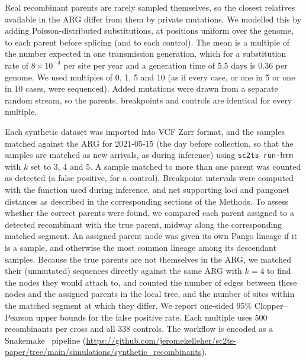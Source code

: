 \documentclass[12pt]{article}
\begin{document}
Real recombinant parents are rarely sampled themselves,
so the closest relatives available in the ARG differ from them by
private mutations.
We modelled this by adding Poisson-distributed substitutions,
at positions uniform over the genome, to each parent before splicing
(and to each control).
The mean is a multiple of the number expected in one transmission generation,
which for a substitution rate of $8\times10^{-4}$ per site per year \cite{Ghafari2022}
and a generation time of 5.5 days \cite{Hart2022} is 0.36 per genome.
We used multiples of 0, 1, 5 and 10
(as if every case, or one in 5 or one in 10 cases, were sequenced).
Added mutations were drawn from a separate random stream,
so the parents, breakpoints and controls are identical for every multiple.

Each synthetic dataset was imported into VCF Zarr format, and the samples
matched against the ARG for 2021-05-15 (the day before collection,
so that the samples are matched as new arrivals, as during inference)
using \texttt{sc2ts run-hmm} with $k$ set to 3, 4 and 5.
A sample matched to more than one parent was counted as detected
(a false positive, for a control).
Breakpoint intervals were computed with the function used during inference,
and net supporting loci and pangonet distances as described in
the corresponding sections of the Methods.
To assess whether the correct parents were found, we compared
each parent assigned to a detected recombinant with the true parent,
midway along the corresponding matched segment.
An assigned parent node was given its own Pango lineage if it is a sample,
and otherwise the most common lineage among its descendant samples.
Because the true parents are not themselves in the ARG,
we matched their (unmutated) sequences directly against the same ARG
with $k=4$ to find the nodes they would attach to,
and counted the number of edges between these nodes and the assigned parents
in the local tree,
and the number of sites within the matched segment at which they differ.
We report one-sided 95\% Clopper--Pearson upper bounds for the false positive rate.
Each multiple uses 500 recombinants per cross and all 338 controls.
The workflow is encoded as a Snakemake~\cite{Koster2012snakemake} pipeline
(\url{https://github.com/jeromekelleher/sc2ts-paper/tree/main/simulations/synthetic_recombinants}).
\end{document}
